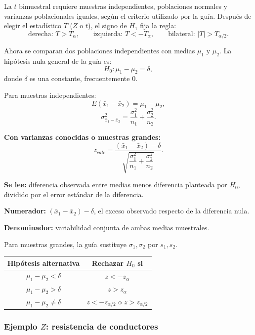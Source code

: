 \documentclass[11pt,a4paper]{article}
\begin{document}
\begin{aclaracion}
La $t$ bimuestral requiere muestras independientes, poblaciones normales y varianzas poblacionales iguales, según el criterio utilizado por la guía. Después de elegir el estadístico $T$ ($Z$ o $t$), el signo de $H_1$ fija la regla:
\[
\text{derecha: }T>T_\alpha,\qquad
\text{izquierda: }T<-T_\alpha,\qquad
\text{bilateral: }|T|>T_{\alpha/2}.
\]
\end{aclaracion}

Ahora se comparan dos poblaciones independientes con medias $\mu_1$ y $\mu_2$. La hipótesis nula general de la guía es:
\[
H_0:\mu_1-\mu_2=\delta,
\]
donde $\delta$ es una constante, frecuentemente $0$.

Para muestras independientes:
\[
E(\bar{x}_1-\bar{x}_2)=\mu_1-\mu_2,
\]
\[
\sigma^2_{\bar{x}_1-\bar{x}_2}=\frac{\sigma_1^2}{n_1}+\frac{\sigma_2^2}{n_2}.
\]

\textbf{Con varianzas conocidas o muestras grandes:}
\[
 z_{calc}=\frac{(\bar{x}_1-\bar{x}_2)-\delta}
 {\sqrt{\dfrac{\sigma_1^2}{n_1}+\dfrac{\sigma_2^2}{n_2}}}.
\]
\begin{leerformula}
\textbf{Se lee:} diferencia observada entre medias menos diferencia planteada por $H_0$, dividido por el error estándar de la diferencia.\par
\textbf{Numerador:} $(\bar{x}_1-\bar{x}_2)-\delta$, el exceso observado respecto de la diferencia nula.\par
\textbf{Denominador:} variabilidad conjunta de ambas medias muestrales.
\end{leerformula}
Para muestras grandes, la guía sustituye $\sigma_1,\sigma_2$ por $s_1,s_2$.

\begin{table}[H]
\centering
\begin{tabular}{cc}
\toprule
Hipótesis alternativa & Rechazar $H_0$ si\\
\midrule
$\mu_1-\mu_2<\delta$ & $z<-z_\alpha$\\
$\mu_1-\mu_2>\delta$ & $z>z_\alpha$\\
$\mu_1-\mu_2\neq\delta$ & $z<-z_{\alpha/2}$ o $z>z_{\alpha/2}$\\
\bottomrule
\end{tabular}
\end{table}

\subsubsection{\texorpdfstring{Ejemplo $Z$: resistencia de conductores}{Ejemplo Z: resistencia de conductores}}
\end{document}
